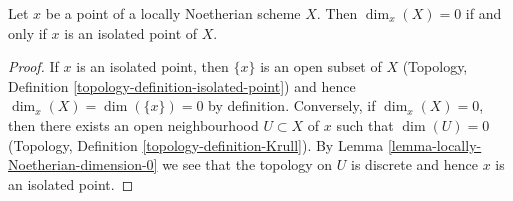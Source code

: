 \begin{lemma}
\label{lemma-isolated-dim-0-locally-noetherian}
Let $x$ be a point of a locally Noetherian scheme $X$.
Then $\dim_x(X) = 0$ if and only if $x$ is an isolated point of $X$.
\end{lemma}

\begin{proof}
If $x$ is an isolated point, then $\{x\}$ is an open subset of $X$
(Topology, Definition \ref{topology-definition-isolated-point})
and hence $\dim_x(X) = \dim(\{x\}) = 0$ by definition. Conversely, if
$\dim_x(X) = 0$, then there exists an open neighbourhood $U \subset X$
of $x$ such that $\dim(U) = 0$
(Topology, Definition \ref{topology-definition-Krull}).
By Lemma \ref{lemma-locally-Noetherian-dimension-0}
we see that the topology on $U$ is discrete and hence
$x$ is an isolated point.
\end{proof}





